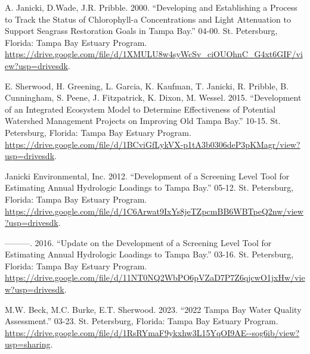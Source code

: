 \documentclass[
  letterpaper,
  DIV=11,
  numbers=noendperiod]{scrreprt}
\newlength{\cslhangindent}
\newlength{\cslentryspacingunit} %
\newenvironment{CSLReferences}[2] %
 {%
  \setlength{\parindent}{0pt}
  \ifodd #1
  \let\oldpar\par
  \def\par{\hangindent=\cslhangindent\oldpar}
  \fi
  \setlength{\parskip}{#2\cslentryspacingunit}
 }%
 {}
\begin{document}
\hypertarget{refs}{}
\begin{CSLReferences}{1}{0}
\leavevmode{}%
A. Janicki, D.Wade, J.R. Pribble. 2000. {``{Developing and Establishing
a Process to Track the Status of Chlorophyll-a Concentrations and Light
Attenuation to Support Seagrass Restoration Goals in Tampa Bay}.''}
04-00. St. Petersburg, Florida: Tampa Bay Estuary Program.
\url{https://drive.google.com/file/d/1XMULU8w4syWcSv_ciOUOhnC_G4xt6GIF/view?usp=drivesdk}.

\leavevmode{}%
E. Sherwood, H. Greening, L. Garcia, K. Kaufman, T. Janicki, R. Pribble,
B. Cunningham, S. Peene, J. Fitzpatrick, K. Dixon, M. Wessel. 2015.
{``{Development of an Integrated Ecosystem Model to Determine
Effectiveness of Potential Watershed Management Projects on Improving
Old Tampa Bay}.''} 10-15. St. Petersburg, Florida: Tampa Bay Estuary
Program.
\url{https://drive.google.com/file/d/1BCviGfLykVX-p1tA3b0306deP3pKMagr/view?usp=drivesdk}.

\leavevmode{}%
Janicki Environmental, Inc. 2012. {``{Development of a Screening Level
Tool for Estimating Annual Hydrologic Loadings to Tampa Bay}.''} 05-12.
St. Petersburg, Florida: Tampa Bay Estuary Program.
\url{https://drive.google.com/file/d/1C6Arwat9IxYs8jeTZpcmBB6WBTpeQ2nw/view?usp=drivesdk}.

\leavevmode{}%
---------. 2016. {``{Update on the Development of a Screening Level Tool
for Estimating Annual Hydrologic Loadings to Tampa Bay}.''} 03-16. St.
Petersburg, Florida: Tampa Bay Estuary Program.
\url{https://drive.google.com/file/d/11NT0NQ2WbPO6pVZaD7P7Z6qjcwO1jxHw/view?usp=drivesdk}.

\leavevmode{}%
M.W. Beck, M.C. Burke, E.T. Sherwood. 2023. {``{2022 Tampa Bay Water
Quality Assessment}.''} 03-23. St. Petersburg, Florida: Tampa Bay
Estuary Program.
\url{https://drive.google.com/file/d/1RsRYmaF9ykxhw3L15YqOI9AE--sog6ib/view?usp=sharing}.

\end{CSLReferences}
\end{document}
